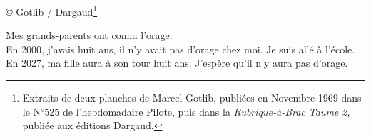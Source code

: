 \vspace*{-3.5mm}
© Gotlib / Dargaud\footnote{Extraits de deux planches de Marcel Gotlib, publiées en Novembre 1969 dans le N°525 de l'hebdomadaire Pilote, puis dans la \textit{Rubrique-à-Brac Taume 2}, publiée aux éditions Dargaud.}  %

\vspace*{-3mm}
\begin{flushright}
\noindent
Mes grands-parents ont connu l'orage.\\
En 2000, j'avais huit ans, il n'y avait pas d'orage chez moi. Je suis allé à l'école.\\
En 2027, ma fille aura à son tour huit ans. J'espère qu'il n'y aura pas d'orage.\\
\end{flushright}
\vspace*{-1cm}

